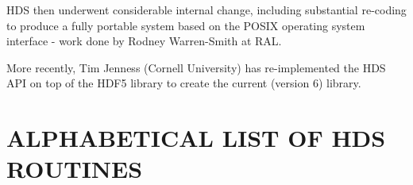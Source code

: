 \documentclass[twoside,11pt]{starlink}
\begin{document}
HDS then underwent considerable internal change, including substantial
re-coding to produce a fully portable system based on the POSIX operating
system interface - work done by Rodney Warren-Smith at RAL.

More recently, Tim Jenness (Cornell University) has re-implemented the
HDS API on top of the HDF5 library to create the current (version 6)
library.

\appendix

\newpage
\section{\label{appendix:alphalist}ALPHABETICAL LIST OF HDS ROUTINES}

\end{document}
